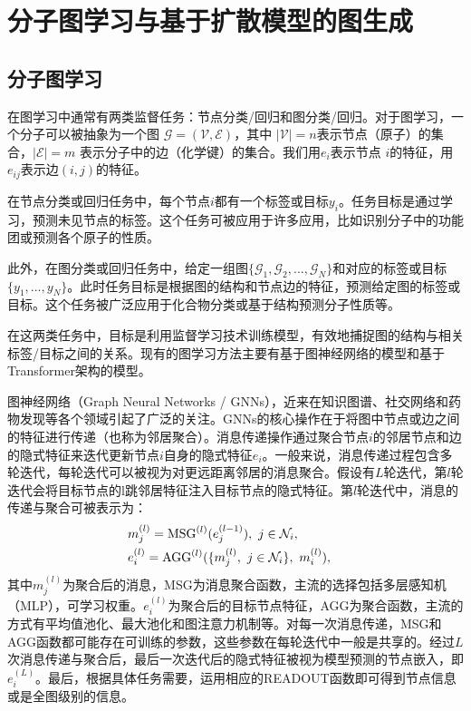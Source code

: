 \chapter[分子图学习与基于扩散模型的图生成]{分子图学习与基于扩散模型的图生成}
\label{chap:diffusion-based_molgen}

\section{分子图学习}
在图学习中通常有两类监督任务：节点分类/回归和图分类/回归。对于图学习，一个分子可以被抽象为一个图 $\mathcal{G} = (\mathcal{V}, \mathcal{E})$，其中 $|\mathcal{V}| = n$表示节点（原子）的集合，$|\mathcal{E}| = m$ 表示分子中的边（化学键）的集合。我们用$e_i$表示节点 $i$的特征，用$e_{ij}$表示边$(i, j)$的特征。

在节点分类或回归任务中，每个节点$i$都有一个标签或目标$y_i$。任务目标是通过学习，预测未见节点的标签。这个任务可被应用于许多应用，比如识别分子中的功能团或预测各个原子的性质。

此外，在图分类或回归任务中，给定一组图$\{ \mathcal{G}_1, \mathcal{G}_2, ..., \mathcal{G}_N \}$和对应的标签或目标 $\{ y_1, ..., y_N \}$。此时任务目标是根据图的结构和节点边的特征，预测给定图的标签或目标。这个任务被广泛应用于化合物分类或基于结构预测分子性质等。

在这两类任务中，目标是利用监督学习技术训练模型，有效地捕捉图的结构与相关标签/目标之间的关系。现有的图学习方法主要有基于图神经网络的模型和基于Transformer架构的模型。

图神经网络（Graph Neural Networks / GNNs），近来在知识图谱、社交网络和药物发现等各个领域引起了广泛的关注。GNNs的核心操作在于将图中节点或边之间的特征进行传递（也称为邻居聚合）。消息传递操作通过聚合节点$i$的邻居节点和边的隐式特征来迭代更新节点$i$自身的隐式特征$e_i$。一般来说，消息传递过程包含多轮迭代，每轮迭代可以被视为对更远距离邻居的消息聚合。假设有$L$轮迭代，第$l$轮迭代会将目标节点的l跳邻居特征注入目标节点的隐式特征。第$l$轮迭代中，消息的传递与聚合可被表示为：
\begin{eqnarray}
    &m_j^{(l)} = {\rm MSG}^{(l)}(e_j^{(l-1)}), \ j \in \mathcal{N}_i, & \\
    &e_i^{(l)} = {\rm AGG}^{(l)}(\{ m_j^{(l)}, \ j \in \mathcal{N}_i \}, \ m_i^{(l)} ), &
\end{eqnarray}
其中$m_j^{(l)}$为聚合后的消息，MSG为消息聚合函数，主流的选择包括多层感知机（MLP），可学习权重。$e_i^{(l)}$为聚合后的目标节点特征，AGG为聚合函数，主流的方式有平均值池化、最大池化和图注意力机制等。对每一次消息传递，MSG和AGG函数都可能存在可训练的参数，这些参数在每轮迭代中一般是共享的。经过$L$次消息传递与聚合后，最后一次迭代后的隐式特征被视为模型预测的节点嵌入，即$e_i^{(L)}$。最后，根据具体任务需要，运用相应的READOUT函数即可得到节点信息或是全图级别的信息。

